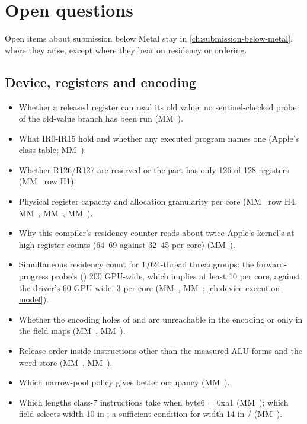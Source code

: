 \chapter{Open questions}\label{ch:not-known-index}

Open items about submission below Metal stay in \cref{ch:submission-below-metal}, where they arise, except where they
bear on residency or ordering.

\section{Device, registers and encoding}\label{sec:device-registers-encoding}

\begin{itemize}
\item Whether a released register can read its old value; no sentinel-checked probe of the old-value branch has been run (MM~).
\item What IR0-IR15 hold and whether any executed program names one (Apple's class table; MM~).
\item Whether R126/R127 are reserved or the part has only 126 of 128 registers (MM~ row H1).
\item Physical register capacity and allocation granularity per core (MM~ row H4, MM~, MM~, MM~).
\item Why this compiler's residency counter reads about twice Apple's kernel's at high register counts (64–69 against 32–45 per core) (MM~).
\item Simultaneous residency count for 1,024-thread threadgroups: the forward-progress probe's () 200 GPU-wide,
  which implies at least 10 per core, against the driver's 60 GPU-wide, 3 per core (MM~, MM~; \cref{ch:device-execution-model}).
\item Whether the encoding holes of  and  are unreachable in the encoding or only in the field maps (MM~, MM~).
\item Release order inside instructions other than the measured ALU forms and the word store (MM~, MM~).
\item Which narrow-pool policy gives better occupancy (MM~).
\item Which lengths class-7 instructions take when byte6 = 0xa1 (MM~); which field selects width 10 in ; a sufficient condition for width 14 in / (MM~).

\end{itemize}
